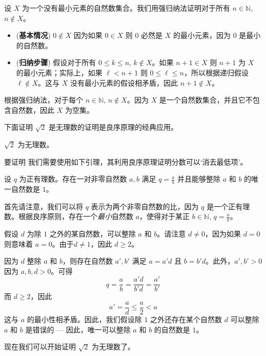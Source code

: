 \begin{cproof}
设 $X$ 为一个没有最小元素的自然数集合。我们用强归纳法证明对于所有 $n \in \mathbb{N}$, $n \not \in X$。
\begin{itemize}
\item (\textbf{基本情况}) $0 \not \in X$ 因为如果 $0 \in X$ 则 $0$ 必然是 $X$ 的最小元素，因为 0 是最小的自然数。
\item (\textbf{归纳步骤}) 假设对于所有 $0 \le k \le n$, $k \not \in X$。如果 $n+1 \in X$ 则 $n+1$ 为 $X$ 的最小元素；实际上，如果 $\ell < n+1$ 则 $0 \le \ell \le n$，所以根据递归假设 $\ell \not \in X$。这与 $X$ 没有最小元素的假设相矛盾，因此 $n+1 \not \in X$。
\end{itemize}
根据强归纳法，对于每个 $n \in \mathbb{N}$, $n \not \in X$。因为 $X$ 是一个自然数集合，并且它不包含自然数，因此 $X$ 为空集。
\end{cproof}

下面证明 $\sqrt{2}$ 是无理数的证明是良序原理的经典应用。

\begin{proposition}
\label{propSqrt2Irrational}
$\sqrt{2}$ 为无理数。
\end{proposition}

要证明  我们需要使用如下引理，其利用良序原理证明分数可以`消去最低项'。

\begin{lemma}
\label{lemFractionInLowestTerms}
设 $q$ 为正有理数。存在一对非零自然数 $a,b$ 满足 $q=\frac{a}{b}$ 并且能够整除 $a$ 和 $b$ 的唯一自然数是 $1$。
\end{lemma}

\begin{cproof}
首先请注意，我们可以将 $q$ 表示为两个非零自然数的比，因为 $q$ 是一个正有理数。根据良序原则，存在一个\textit{最小}自然数 $a$，使得对于某正 $b \in \mathbb{N}$, $q=\frac{a}{b}$。

假设 $d$ 为除 $1$ 之外的某自然数，可以整除 $a$ 和 $b$。请注意 $d \ne 0$，因为如果 $d=0$ 则意味着 $a=0$。由于$d \ne 1$，因此 $d \ge 2$。

因为 $d$ 整除 $a$ 和 $b$，则存在自然数 $a',b'$ 满足 $a=a'd$ 且 $b=b'd$。此外，$a',b'>0$ 因为 $a,b,d > 0$。可得
\[ q = \frac{a}{b} = \frac{a'd}{b'd} = \frac{a'}{b'} \]
而 $d \ge 2$，因此
\[ a' = \frac{a}{d} \le \frac{a}{2} < a \]
这与 $a$ 的最小性相矛盾。因此，我们假设除 $1$ 之外还存在某个自然数 $d$ 可以整除 $a$ 和 $b$ 是错误的 --- 因此，唯一可以整除 $a$ 和 $b$ 的自然数是 $1$。
\end{cproof}

现在我们可以开始证明 $\sqrt{2}$ 为无理数了。


